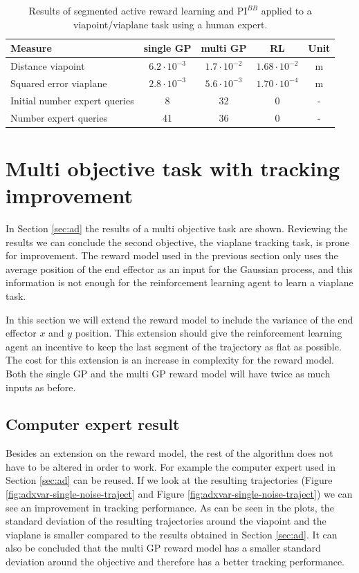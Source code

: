 \documentclass[mscThesis.tex]{subfiles}
\begin{document}
\begin{table}[!htb]
    \centering
    \caption{Results of segmented active reward learning and $\text{PI}^{BB}$ applied to a viapoint/viaplane task using a human expert.}
    \label{tab:ad-human}
    \begin{tabular}{|p{6cm}|c|c|c|c|}
        \hline
        Measure & single GP & multi GP & RL & Unit \\ \hline \hline
        Distance viapoint & $6.2 \cdot 10^{-3}$ & $ 1.7 \cdot 10^{-2}$ & $1.68 \cdot 10^{-2}$ & \si{m}  \\ \hline
        Squared error viaplane & $2.8 \cdot 10^{-3}$ & $5.6 \cdot 10^{-3}$ & $1.70 \cdot 10^{-4}$ & \si{m}  \\ \hline
        Initial number expert queries & 8 & 32 & 0 & - \\ \hline
        Number expert queries & 41 & 36 & 0 &  - \\ \hline
    \end{tabular}
\end{table}


\section{Multi objective task with tracking improvement}
\label{sec:ad-var}
In Section \ref{sec:ad} the results of a multi objective task are shown. Reviewing the results we can conclude the second objective, the viaplane tracking task, is prone for improvement. The reward model used in the previous section only uses the average position of the end effector as an input for the Gaussian process, and this information is not enough for the reinforcement learning agent to learn a viaplane task. 

In this section we will extend the reward model to include the variance of the end effector $x$ and $y$ position. This extension should give the reinforcement learning agent an incentive to keep the last segment of the trajectory as flat as possible. The cost for this extension is an increase in complexity for the reward model. Both the single GP and the multi GP reward model will have twice as much inputs as before.


\subsection{Computer expert result}
Besides an extension on the reward model, the rest of the algorithm does not have to be altered in order to work. For example the computer expert used in Section \ref{sec:ad} can be reused. If we look at the resulting trajectories (Figure \ref{fig:adxvar-single-noise-traject} and Figure \ref{fig:adxvar-single-noise-traject}) we can see an improvement in tracking performance. As can be seen in the plots, the standard deviation of the resulting trajectories around the viapoint and the viaplane is smaller compared to the results obtained in Section \ref{sec:ad}. It can also be concluded that the multi GP reward model has a smaller standard deviation around the objective and therefore has a better tracking performance.
\end{document}

